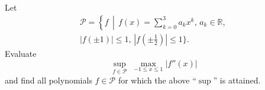 \documentclass{article}
\begin{document}
	\setlength{\parindent}{0pt}
	Let 
	\begin{multline*}
		\mathcal{P}=\left\{f \,\middle\vert\, f(x)=\sum_{k=0}^{3}a_kx^k,\, a_k\in\mathbb{R},\,\right.\\
		\lvert f(\pm1)\rvert\leq 1,\, \left\lvert f\left(\pm\frac{1}{2}\right)\right\rvert\leq1\Bigg\}.
	\end{multline*}
	Evaluate
	$$\sup_{f\in\mathcal{P}}\;\max_{-1\leq x\leq1}\lvert f''(x)\rvert$$
	and find all polynomials $f\in{\mathcal P}$ for which the above ``$\sup$'' is attained.
\end{document}
